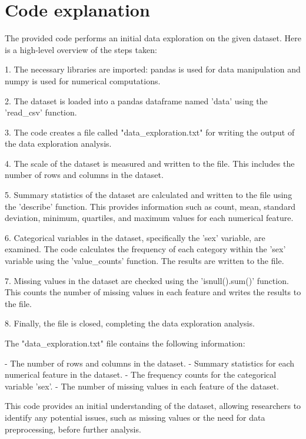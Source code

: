 \documentclass[11pt]{article}
\author{Data to Paper}
\begin{document}
\section*{Code explanation}
The provided code performs an initial data exploration on the given dataset. Here is a high-level overview of the steps taken:

1. The necessary libraries are imported: pandas is used for data manipulation and numpy is used for numerical computations.

2. The dataset is loaded into a pandas dataframe named 'data' using the 'read\_csv' function.

3. The code creates a file called "data\_exploration.txt" for writing the output of the data exploration analysis.

4. The scale of the dataset is measured and written to the file. This includes the number of rows and columns in the dataset.

5. Summary statistics of the dataset are calculated and written to the file using the 'describe' function. This provides information such as count, mean, standard deviation, minimum, quartiles, and maximum values for each numerical feature.

6. Categorical variables in the dataset, specifically the 'sex' variable, are examined. The code calculates the frequency of each category within the 'sex' variable using the 'value\_counts' function. The results are written to the file.

7. Missing values in the dataset are checked using the 'isnull().sum()' function. This counts the number of missing values in each feature and writes the results to the file.

8. Finally, the file is closed, completing the data exploration analysis.

The "data\_exploration.txt" file contains the following information:

- The number of rows and columns in the dataset.
- Summary statistics for each numerical feature in the dataset.
- The frequency counts for the categorical variable 'sex'.
- The number of missing values in each feature of the dataset.

This code provides an initial understanding of the dataset, allowing researchers to identify any potential issues, such as missing values or the need for data preprocessing, before further analysis.
\end{document}
